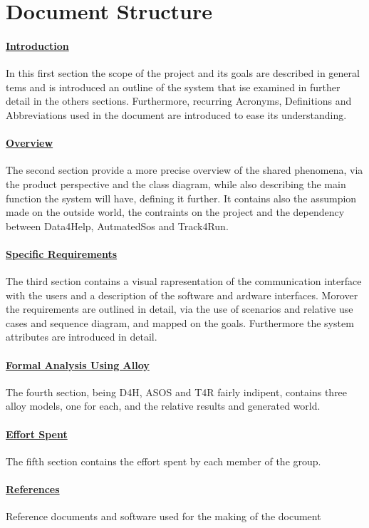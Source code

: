 \section{Document Structure}
\paragraph{\hyperref[sect:introduction]{Introduction}} In this first section the scope of the project and its goals are described in general tems and is introduced an outline of the system that ise examined in further detail in the others sections. Furthermore, recurring Acronyms, Definitions and Abbreviations used in the document are introduced to ease its understanding.
\paragraph{\hyperref[sect:overview]{Overview}} The second section provide a more precise overview of the shared phenomena, via the product perspective and the class diagram, while also describing the main function the system will have, defining it further. It contains also the assumpion made on the outside world, the contraints on the project and the dependency between Data4Help, AutmatedSos and Track4Run.
\paragraph{\hyperref[sect:requirements]{Specific Requirements}} The third section contains a visual rapresentation of the communication interface with the users and a description of the software and ardware interfaces. Morover the requirements are outlined in detail, via the use of scenarios and relative use cases and sequence diagram, and mapped on the goals. Furthermore the system attributes are introduced in detail.
\paragraph{\hyperref[sect:alloy]{Formal Analysis Using Alloy}} The fourth section, being D4H, ASOS and T4R fairly indipent, contains three alloy models, one for each, and the relative results and generated world.
\paragraph{\hyperref[sect:effort]{Effort Spent}} The fifth section contains the effort spent by each member of the group.
\paragraph{\hyperref[sect:references]{References}} Reference documents and software used for the making of the document


